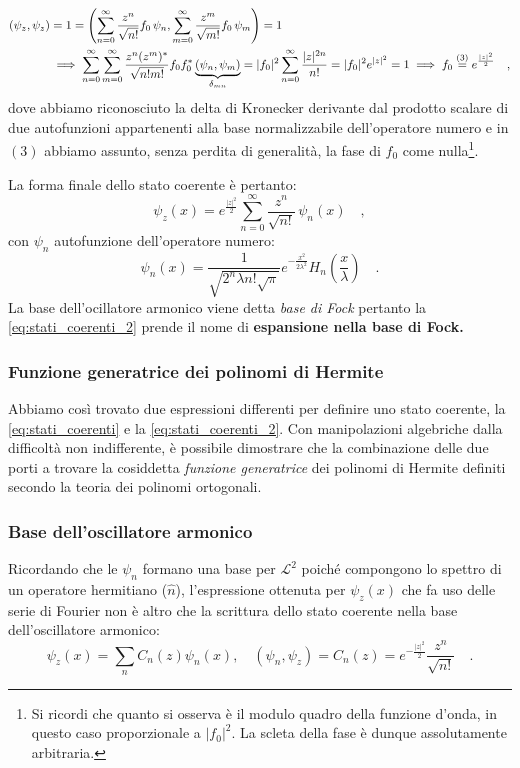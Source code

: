 \[
    \begin{aligned}
        (\psi_z,\psi_z) &= 1 = \left( \sum_{n=0}^\infty \frac{z^n}{\sqrt{n!}}f_0\, \psi_n, \sum_{m=0}^\infty \frac{z^m}{\sqrt{m!}}f_0\, \psi_m \right) = 1 \\
        &\implies \sum_{n=0}^\infty\sum_{m=0}^\infty \frac{z^n (z^m)^*}{\sqrt{n!m!}}f_0f_0^*\underbrace{(\psi_n,\psi_m)}_{\delta_{mn}} = |f_0|^2 \sum_{n=0}^\infty \frac{|z|^{2n}}{n!} = |f_0|^2 e^{|z|^2} = 1 \implies f_0 \giustifica[=]{3} e^{\frac{|z|^2}{2}} \quad,
    \end{aligned}
\]
dove abbiamo riconosciuto la delta di Kronecker derivante dal prodotto scalare di due autofunzioni appartenenti alla base normalizzabile dell'operatore numero e in $(3)$ abbiamo assunto, senza perdita di generalità, la fase di $f_0$ come nulla\footnote{Si ricordi che quanto si osserva è il modulo quadro della funzione d'onda, in questo caso proporzionale a $|f_0|^2$. La scleta della fase è dunque assolutamente arbitraria.}. 

La forma finale dello stato coerente è pertanto:
\begin{equation}
        \psi_z(x) = e^{\frac{|z|^2}{2}}  \sum_{n=0}^\infty \frac{z^n}{\sqrt{n!}}\, \psi_n(x) \quad, 
        \label{eq:stati_coerenti_2}
\end{equation}
con $\psi_n$ autofunzione dell'operatore numero:
\[
    \psi_n(x) = \frac{1}{\sqrt{2^n \lambda n!\sqrt{\pi}}}e^{-\frac{x^2}{2\lambda^2}}H_n\left({\frac{x}{\lambda}}\right) \quad.
\]
La base dell'ocillatore armonico viene detta \emph{base di Fock} pertanto la \eqref{eq:stati_coerenti_2} prende il nome di \textbf{espansione nella base di Fock.}

\subsubsection{Funzione generatrice dei polinomi di Hermite}
Abbiamo così trovato due espressioni differenti per definire uno stato coerente, la \eqref{eq:stati_coerenti} e la \eqref{eq:stati_coerenti_2}. Con manipolazioni algebriche dalla difficoltà non indifferente, è possibile dimostrare che la combinazione delle due porti a trovare la cosiddetta \emph{funzione generatrice} dei polinomi di Hermite definiti secondo la teoria dei polinomi ortogonali. 

\subsubsection{Base dell'oscillatore armonico}
Ricordando che le $\psi_n$ formano una base per $\mathcal{L}^2$ poiché compongono lo spettro di un operatore hermitiano ($\hat{n}$), l'espressione ottenuta per $\psi_z(x)$ che fa uso delle serie di Fourier non è altro che la scrittura dello stato coerente nella base dell'oscillatore armonico:
\[
    \psi_z(x) = \sum_n C_n(z)\psi_n(x), \quad (\psi_n, \psi_z) = C_n(z) = e^{-\frac{|z|^2}{2}}\frac{z^n}{\sqrt{n!}} \quad.
\]


